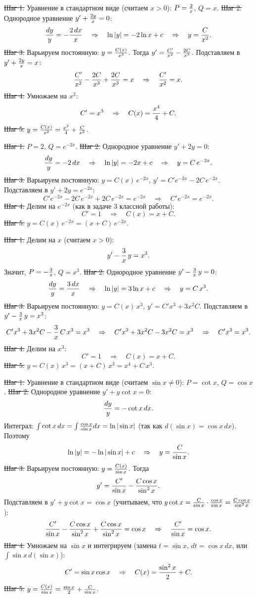 \st{Шаг 1.} Уравнение в стандартном виде (считаем $x>0$):
$P={2\over x}$, $Q=x$.
\st{Шаг 2.} Однородное уравнение $y'+{2y\over x}=0$:
$${dy\over y}=-{2\,dx\over x}\quad\Rightarrow\quad\ln|y|=-2\ln x+c
\quad\Rightarrow\quad y={C\over x^2}.$$
\st{Шаг 3.} Варьируем постоянную: $y={C(x)\over x^2}$. Тогда
$y'={C'\over x^2}-{2C\over x^3}$. Подставляем в $y'+{2y\over x}=x$:
$${C'\over x^2}-{2C\over x^3}+{2C\over x^3}=x\quad\Rightarrow\quad
{C'\over x^2}=x.$$
\st{Шаг 4.} Умножаем на $x^2$:
$$C'=x^3\quad\Rightarrow\quad C(x)={x^4\over4}+C.$$
\st{Шаг 5.} $y={C(x)\over x^2}={x^2\over4}+{C\over x^2}$.

\st{Шаг 1.} $P=2$, $Q=e^{-2x}$.
\st{Шаг 2.} Однородное уравнение $y'+2y=0$:
$${dy\over y}=-2\,dx\quad\Rightarrow\quad\ln|y|=-2x+c
\quad\Rightarrow\quad y=C\,e^{-2x}.$$
\st{Шаг 3.} Варьируем постоянную: $y=C(x)\,e^{-2x}$,
$y'=C'e^{-2x}-2C\,e^{-2x}$. Подставляем в $y'+2y=e^{-2x}$:
$$C'e^{-2x}-2C\,e^{-2x}+2C\,e^{-2x}=e^{-2x}\quad\Rightarrow\quad
C'e^{-2x}=e^{-2x}.$$
\st{Шаг 4.} Делим на $e^{-2x}$ (как в задаче 3 классной работы):
$$C'=1\quad\Rightarrow\quad C(x)=x+C.$$
\st{Шаг 5.} $y=C(x)\,e^{-2x}=(x+C)\,e^{-2x}$.

\st{Шаг 1.} Делим на $x$ (считаем $x>0$):
$$y'-{3\over x}\,y=x^3.$$
Значит, $P=-{3\over x}$, $Q=x^3$.
\st{Шаг 2.} Однородное уравнение $y'-{3\over x}\,y=0$:
$${dy\over y}={3\,dx\over x}\quad\Rightarrow\quad\ln|y|=3\ln x+c
\quad\Rightarrow\quad y=C\,x^3.$$
\st{Шаг 3.} Варьируем постоянную: $y=C(x)\,x^3$, $y'=C'x^3+3x^2C$.
Подставляем в $y'-{3\over x}\,y=x^3$:
$$C'x^3+3x^2C-{3\over x}\,C\,x^3=x^3\quad\Rightarrow\quad
C'x^3+3x^2C-3x^2C=x^3\quad\Rightarrow\quad C'x^3=x^3.$$
\st{Шаг 4.} Делим на $x^3$:
$$C'=1\quad\Rightarrow\quad C(x)=x+C.$$
\st{Шаг 5.} $y=C(x)\,x^3=(x+C)\,x^3=x^4+C\,x^3$.

\st{Шаг 1.} Уравнение в стандартном виде (считаем $\sin x\ne0$):
$P=\cot x$, $Q=\cos x$.
\st{Шаг 2.} Однородное уравнение $y'+y\cot x=0$:
$${dy\over y}=-\cot x\,dx.$$
Интеграл: $\int\cot x\,dx=\int{\cos x\over\sin x}dx=\ln|\sin x|$
(так как $d(\sin x)=\cos x\,dx$). Поэтому
$$\ln|y|=-\ln|\sin x|+c\quad\Rightarrow\quad y={C\over\sin x}.$$
\st{Шаг 3.} Варьируем постоянную: $y={C(x)\over\sin x}$. Тогда
$$y'={C'\over\sin x}-{C\cos x\over\sin^2x}.$$
Подставляем в $y'+y\cot x=\cos x$ (учитываем, что
$y\cot x={C\over\sin x}\cdot{\cos x\over\sin x}={C\cos x\over\sin^2x}$):
$${C'\over\sin x}-{C\cos x\over\sin^2x}+{C\cos x\over\sin^2x}=\cos x
\quad\Rightarrow\quad{C'\over\sin x}=\cos x.$$
\st{Шаг 4.} Умножаем на $\sin x$ и интегрируем
(замена $t=\sin x$, $dt=\cos x\,dx$, или $\int\sin x\,d(\sin x)$):
$$C'=\sin x\cos x\quad\Rightarrow\quad C(x)={\sin^2x\over2}+C.$$
\st{Шаг 5.} $y={C(x)\over\sin x}={\sin x\over2}+{C\over\sin x}$.

